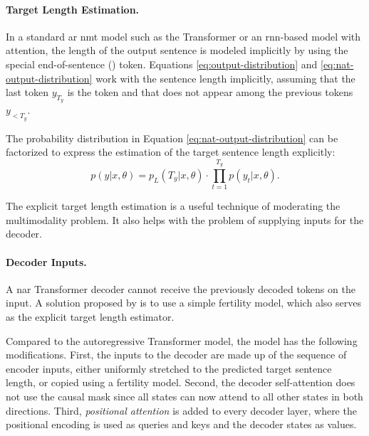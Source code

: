 \paragraph{Target Length Estimation.} In a standard \ac{ar} \ac{nmt} model such
as the Transformer or an \acs{rnn}-based model with attention, the length of
the output sentence is modeled implicitly by using the special end-of-sentence
(\eos{}) token. Equations \ref{eq:output-distribution} and
\ref{eq:nat-output-distribution} work with the sentence length implicitly,
assuming that the last token $y_{T_y}$ is the \eos{} token and that \eos{} does
not appear among the previous tokens $y_{<T_y}$.

The probability distribution in Equation \ref{eq:nat-output-distribution} can
be factorized to express the estimation of the target sentence length
explicitly: %
\begin{equation}
  p(y|x, \theta) = p_L(T_y|x, \theta) \cdot \prod_{t=1}^{T_y}p(y_t|x,\theta).
  \label{eq:explicit-length}
\end{equation}

The explicit target length estimation is a useful technique of moderating the
multimodality problem.  It also helps with the problem of
supplying inputs for the decoder.

\paragraph{Decoder Inputs.} A \acs{nar} Transformer decoder cannot
receive the previously decoded tokens on the input. A solution proposed by
\citet{gu2017nonautoregressive} is to use a simple fertility model, which also
serves as the explicit target length estimator.

Compared to the autoregressive Transformer model, the model has the following
modifications. First, the inputs to the decoder are made up of the sequence of
encoder inputs, either uniformly stretched to the predicted target sentence
length, or copied using a fertility model. Second, the decoder self-attention
does not use the causal mask since all states can now attend to all other
states in both directions. Third, \emph{positional attention} is added to every
decoder layer, where the positional encoding is used as queries and keys and
the decoder states as values. 

